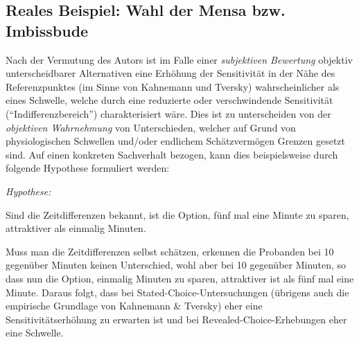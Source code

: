 




\subsection{Reales Beispiel: Wahl der Mensa bzw. Imbissbude}

Nach der Vermutung des Autors ist im Falle einer \emph{subjektiven
  Bewertung} objektiv unterscheidbarer Alternativen eine
Erh\"ohung der Sensitivit\"at in der N\"ahe
des Referenzpunktes (im Sinne von Kahnemann und Tversky) 
wahrscheinlicher als eines Schwelle, welche durch eine
reduzierte oder verschwindende Sensitivit\"at (``Indifferenzbereich'')
charakterisiert w\"are. Dies ist zu unterscheiden von der
\emph{objektiven Wahrnehmung} von Unterschieden, welcher auf Grund von
physiologischen Schwellen und/oder endlichem Sch\"atzverm\"ogen
Grenzen gesetzt sind. Auf einen konkreten Sachverhalt bezogen, kann
dies beispielsweise durch folgende Hypothese formuliert werden:
\medskip

\emph{Hypothese:}

\bi
\item Sind die Zeitdifferenzen bekannt, ist die Option, f\"unf mal eine Minute zu
  sparen, attraktiver als einmalig
  \unit[5]{Minuten}.
\item Muss man die Zeitdifferenzen selbst sch\"atzen, erkennen die
  Probanden bei 10 gegen\"uber \unit[11]{Minuten} keinen Unterschied,
  wohl aber bei 10 gegen\"uber \unit[15]{Minuten}, so dass nun die
  Option, einmalig 
  \unit[5]{Minuten} zu sparen, attraktiver ist als f\"unf mal eine
  Minute.
\ei
Daraus folgt, dass bei Stated-Choice-Untersuchungen (\"ubrigens auch
die empirische Grundlage von Kahnemann \& Tversky) eher eine
Sensitivit\"atserh\"ohung zu erwarten ist und bei Revealed-Choice-Erhebungen eher
eine Schwelle.

